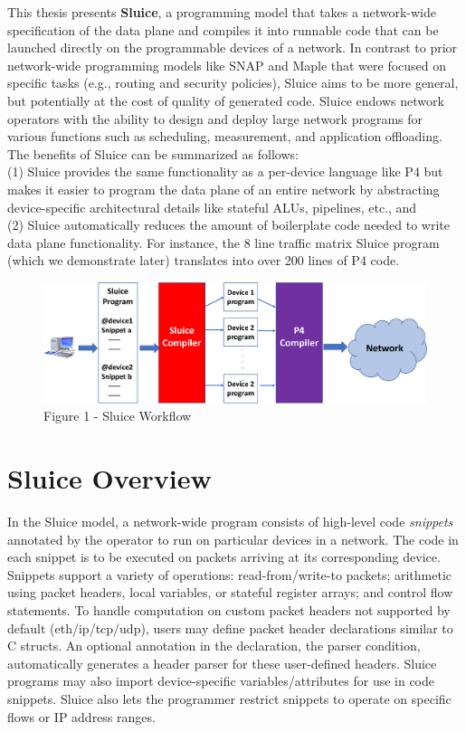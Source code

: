 \documentclass[12pt, oneside]{article}
\begin{document}
This thesis presents \textbf{Sluice}, a programming model that takes a
network-wide specification of the data plane and compiles it into runnable code
that can be launched directly on the programmable devices of a network. In
contrast to prior network-wide programming models like SNAP and Maple that were
focused on specific tasks (e.g., routing and security policies), Sluice aims to
be more general, but potentially at the cost of quality of generated code.
Sluice endows network operators with the ability to design and deploy large
network programs for various functions such as scheduling, measurement, and
application offloading.  The benefits of Sluice can be summarized as follows:\\
\quad  (1) Sluice provides the same functionality as a per-device language like P4 but makes it easier to program the data plane of an entire network by abstracting device-specific architectural details like stateful ALUs, pipelines, etc., and\\
\quad  (2) Sluice automatically reduces the amount of boilerplate code needed to write data plane functionality. For instance, the 8 line traffic matrix Sluice program (which we demonstrate later) translates into over 200 lines of P4 code. 

\begin{figure}[tp]
\centering
\includegraphics[width=140mm,scale=0.7]{figures/sluice_workflow.pdf}
\caption{Figure 1 - Sluice Workflow}
\end{figure}

\newpage
\section{Sluice Overview}
In the Sluice model, a network-wide program consists of high-level code
\textit{snippets} annotated by the operator to run on particular devices in a
network. The code in each snippet is to be executed on packets arriving at its
corresponding device. Snippets support a variety of operations:
read-from/write-to packets; arithmetic using packet headers, local variables, or
stateful register arrays; and control flow statements. To handle computation on
custom packet headers not supported by default (eth/ip/tcp/udp), users may
define packet header declarations similar to C structs. An optional annotation
in the declaration, the parser condition, automatically generates a header
parser for these user-defined headers. Sluice programs may also import
device-specific variables/attributes for use in code snippets. Sluice also lets
the programmer restrict snippets to operate on specific flows or IP address
ranges.
\end{document}

